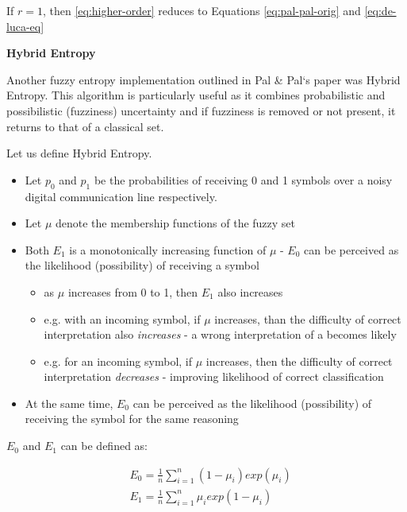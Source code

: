 \noindent If $r = 1$, then \eqref{eq:higher-order} reduces to Equations \eqref{eq:pal-pal-orig} and \eqref{eq:de-luca-eq}

\noindent \textbf{Hybrid Entropy}

Another fuzzy entropy implementation outlined in Pal \& Pal`s paper was Hybrid Entropy. This algorithm is particularly useful as it combines probabilistic and possibilistic (fuzziness) uncertainty and if fuzziness is removed or not present, it returns to that of a classical set.

Let us define Hybrid Entropy.

\begin{itemize}
\item Let $p_0$ and $p_1$ be the probabilities of receiving 0 and 1 symbols over a noisy digital communication line respectively.
\item Let $\mu$ denote the membership functions of the fuzzy set 
\item Both $E_1$ is a monotonically increasing function of $\mu$ - $E_0$ can be perceived as the likelihood (possibility) of receiving a  symbol
\begin{itemize}
    \item as $\mu$ increases from 0 to 1, then $E_1$ also increases
    \item e.g. with an incoming  symbol, if $\mu$ increases, than the difficulty of correct interpretation also \textit{increases} - a wrong interpretation of a  becomes likely
    \item e.g. for an incoming  symbol, if $\mu$ increases, then the difficulty of correct interpretation \textit{decreases} - improving likelihood of correct classification
  \end{itemize}
\item At the same time, $E_0$ can be perceived as the likelihood (possibility) of receiving the  symbol for the same reasoning
\end{itemize}

$E_0$ and $E_1$ can be defined as:

\begin{subequations} \label{eq:E0-E1}
  \begin{align}
    &E_0 = \frac{1}{n}\displaystyle\sum_{i=1}^{n}{(1-\mu_i)exp(\mu_i)} \\
    &E_1 = \frac{1}{n}\displaystyle\sum_{i=1}^{n}{\mu_iexp(1-\mu_i)}
  \end{align}
\end{subequations}

